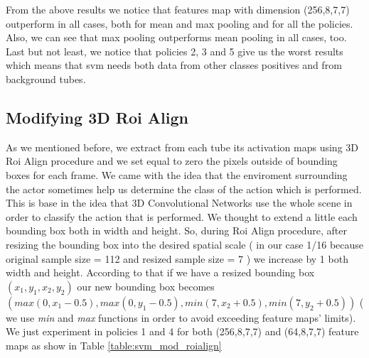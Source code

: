 From the above results we notice that features map with dimension (256,8,7,7) outperform in all cases, both for mean and max pooling and
for all the policies. Also, we can see that max pooling outperforms mean pooling in all cases, too. Last but not least, we notice that policies
2, 3 and 5 give us the worst results which means that svm needs both data from other classes positives and from background tubes. 

\subsection{Modifying 3D Roi Align}
As we mentioned before, we extract from each tube its activation maps using 3D Roi Align procedure and we set equal to zero the pixels outside
of bounding boxes for each frame. We came with the idea that the enviroment surrounding the actor sometimes help us determine the class
of the action which is performed. This is base in the idea that 3D Convolutional Networks use the whole scene in order to classify the action
that is performed. We thought to extend a little each bounding box both in width and height. So, during Roi Align procedure, after resizing
the bounding box into the desired spatial scale  ( in our case 1/16 because original sample size = 112 and resized sample size = 7 )
we increase by 1 both width and height. According to that if we have a resized bounding box $( x_1,y_1,x_2,y_2) $ our new bounding box becomes
$ (max(0,x_1-0.5),max(0,y_1-0.5),min(7,x_2+0.5),min(7,y_2+0.5)) $ ( we use \textit{ min} and \textit{max} functions in order to avoid exceeding feature maps' limits).
We just experiment in policies 1 and 4 for both (256,8,7,7) and (64,8,7,7) feature maps as show in  Table \ref{table:svm_mod_roialign}




